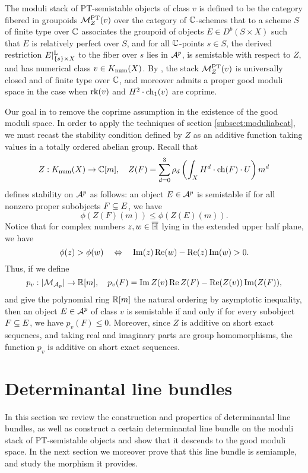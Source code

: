 The moduli stack of PT-semistable objects of class $v$ is defined to be the category fibered in groupoids $\mathcal{M}^{\text{PT}}_Z(v)$ over the category of $\mathbb{C}$-schemes that to a scheme $S$ of finite type over $\mathbb{C}$ associates the groupoid of objects $E \in D^b(S \times X)$ such that $E$ is relatively perfect over $S$, and for all $\mathbb{C}$-points $s \in S$, the derived restriction $E|^{\mathbb{L}}_{\{s\}\times X}$ to the fiber over $s$ lies in $\mathcal{A}^p$, is semistable with respect to $Z$, and has numerical class $v \in K_{\mathrm{num}}(X)$. By \cite[Theorem 1.1]{lo-PT2}, the stack $\mathcal{M}^{\text{PT}}_Z(v)$ is universally closed and of finite type over $\mathbb{C}$, and moreover admits a proper good moduli space in the case when $\operatorname{\mathrm{rk}}(v)$ and $H^2 \cdot \operatorname{\mathrm{ch}}_1(v)$ are coprime.

Our goal in to remove the coprime assumption in the existence of the good moduli space. In order to apply the techniques of section \ref{subsect:moduliabcat}, we must recast the stability condition defined by $Z$ as an additive function taking values in a totally ordered abelian group. Recall that 
\[ Z: K_{\mathrm{num}}(X) \to \mathbb{C}[m], \quad Z(F) = \sum_{d=0}^3 \rho_d \left(\int_X H^d \cdot \operatorname{\mathrm{ch}}(F) \cdot U \right) m^d \]
defines stability on $\mathcal{A}^p$ as follows: an object $E \in \mathcal{A}^p$ is semistable if for all nonzero proper subobjects $F \subseteq E$, we have
\[ \phi(Z(F)(m)) \le \phi(Z(E)(m)). \]
Notice that for complex numbers $z, w \in \overline{\mathbb{H}}$ lying in the extended upper half plane, we have
\[ \phi(z) > \phi(w) \quad \Leftrightarrow \quad  \operatorname{\mathrm{Im}}(z) \operatorname{\mathrm{Re}}(w) - \operatorname{\mathrm{Re}}(z) \operatorname{\mathrm{Im}}(w) > 0. \]
Thus, if we define
\begin{equation}\label{realvaluedcharge}
    p_v: |\mathcal{M}_{\mathcal{A}_p}| \to \mathbb{R}[m], \quad p_v(F) = \operatorname{\mathrm{Im}} Z(v) \operatorname{\mathrm{Re}} Z(F) - \operatorname{\mathrm{Re}}(Z(v)) \operatorname{\mathrm{Im}}(Z(F)),
\end{equation}
and give the polynomial ring $\mathbb{R}[m]$ the natural ordering by asymptotic inequality, then an object $E \in \mathcal{A}^p$ of class $v$ is semistable if and only if for every subobject $F \subseteq E$, we have $p_v(F) \le 0$. Moreover, since $Z$ is additive on short exact sequences, and taking real and imaginary parts are group homomorphisms, the function $p_v$ is additive on short exact sequences.

\section{Determinantal line bundles}
In this section we review the construction and properties of determinantal line bundles, as well as construct a certain determinantal line bundle on the moduli stack of PT-semistable objects and show that it descends to the good moduli space. In the next section we moreover prove that this line bundle is semiample, and study the morphism it provides.

